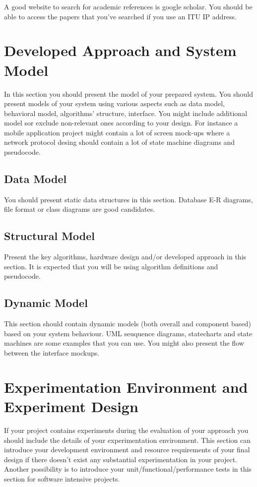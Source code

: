 \documentclass[a4paper, 12pt, titlepage]{article}
\begin{document}
A good website to search for academic references is google scholar. You should be able to access the papers that you've searched if you use an ITU IP address.
\newpage

\section{Developed Approach and System Model}
In this section you should present the model of your prepared system. You should present models of your system using various aspects such as data model, behavioral model, algorithms’ structure, interface. You might include additional model sor exclude non-relevant ones according to your design. For instance a mobile application project might contain a lot of screen mock-ups where a network protocol desing should contain a lot of state machine diagrams and pseudocode.
\subsection{Data Model}
You should present static data structures in this section. Database E-R diagrams, file format or class diagrams are good candidates.
\subsection{Structural Model}
Present the key algorithms, hardware design and/or developed approach in this section. It is expected that you will be using algorithm definitions and pseudocode.
\subsection{Dynamic Model}
This section should contain dynamic models (both overall and component based) based on your system behaviour. UML seuquence diagrams, statecharts and state machines are some examples that you can use. You might also present the flow between the interface mockups.

\newpage
\section{Experimentation Environment and Experiment Design} 
If your project contains experiments during the evaluation of your approach you should include the details of your experimentation environment. This section can introduce your development environment and resource requirements of your final design if there doesn’t exist any substantial experimentation in your project. Another possibility is to introduce your unit/functional/performance tests in this section for software intensive projects.
\end{document}
